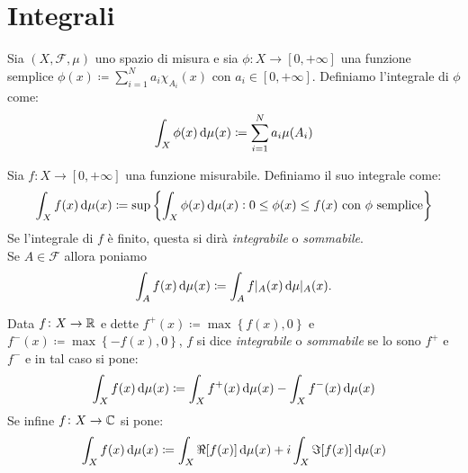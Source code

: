 %
%

\section{Integrali}
\begin{definition}
    Sia $ (X,\mathcal{F},\mu) $ uno spazio di misura e sia $ \phi\colon X\to [0,+\infty] $ una funzione semplice $ \phi(x) \coloneqq \sum_{i=1}^N a_i\chi_{A_i}(x)$ con $ a_i\in[0,+\infty] $. Definiamo l'integrale di $ \phi $ come:
    \[ \int_X \phi(x)\dif\mu(x) \coloneqq \sum_{i=1}^{N} a_i \mu(A_i) \]
\end{definition}

\begin{definition}
    Sia $ f\colon X\to [0,+\infty] $ una funzione misurabile. Definiamo il suo integrale come:
    \[ \int_X f(x)\dif\mu(x) \coloneqq \sup\left\{ \int_X \phi(x)\dif\mu(x) : 0 \leq \phi(x) \leq f(x) \text{ con $\phi$ semplice} \right\} \]
    Se l'integrale di $ f $ è finito, questa si dirà \emph{integrabile} o \emph{sommabile}. \\
    Se $ A \in \mathcal{F} $ allora poniamo 
    \[
    \int_A f(x)\dif\mu(x) \coloneqq \int_A f\rvert_A(x) \dif\mu\rvert_A(x).
    \]
\end{definition}

\begin{definition}[Integrale]
    Data $ f\colon X\to\mathbb{R} $ e dette $ f^+(x) \coloneqq \max\left\{f(x),0\right\} $ e $ f^-(x) \coloneqq \max\left\{-f(x), 0\right\} $, $ f $ si dice \emph{integrabile} o \emph{sommabile} se lo sono $ f^+ $ e $ f^- $ e in tal caso si pone:
    \[ \int_X f(x)\dif\mu(x) \coloneqq \int_X f^+(x)\dif\mu(x) - \int_X f^-(x)\dif\mu(x) \]
    Se infine $ f\colon X\to\mathbb{C} $ si pone:
    \[ \int_X f(x)\dif\mu(x) \coloneqq \int_X\Re[f(x)]\dif\mu(x) + i\int_X\Im[f(x)]\dif\mu(x) \]
\end{definition}

